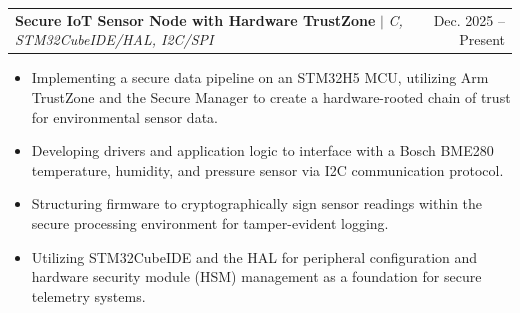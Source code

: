 \documentclass[letterpaper,11pt]{article}
\makeatletter
\newcommand{\resumeItem}[1]{
  \item\small{
    {#1 \vspace{-2pt}}
  }
}
\newcommand{\resumeProjectHeading}[2]{
    \item
    \begin{tabular*}{0.97\textwidth}{l@{\extracolsep{\fill}}r}
      \small#1 & #2 \\
    \end{tabular*}\vspace{-7pt}
}
\newcommand{\resumeItemListStart}{\begin{itemize}}
\newcommand{\resumeItemListEnd}{\end{itemize}\vspace{-5pt}}
\makeatother
\begin{document}

      \resumeProjectHeading
          {\textbf{Secure IoT Sensor Node with Hardware TrustZone} $|$ \emph{C, STM32CubeIDE/HAL, I2C/SPI}}{Dec. 2025 -- Present}
          \resumeItemListStart
            \resumeItem{Implementing a secure data pipeline on an STM32H5 MCU, utilizing Arm TrustZone and the Secure Manager to create a hardware-rooted chain of trust for environmental sensor data.}
            \resumeItem{Developing drivers and application logic to interface with a Bosch BME280 temperature, humidity, and pressure sensor via I2C communication protocol.}
            \resumeItem{Structuring firmware to cryptographically sign sensor readings within the secure processing environment for tamper-evident logging.}
            \resumeItem{Utilizing STM32CubeIDE and the HAL for peripheral configuration and hardware security module (HSM) management as a foundation for secure telemetry systems.}
          \resumeItemListEnd
        \vspace{-2pt}

          
\end{document}
